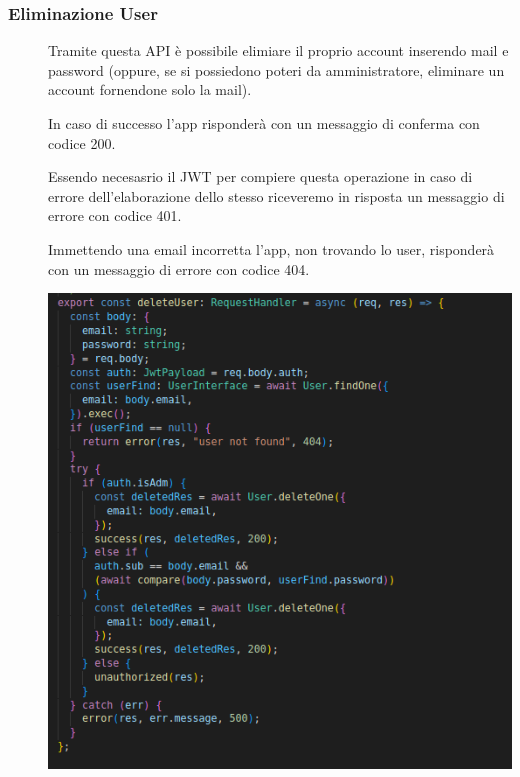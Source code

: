 \documentclass{article}
\begin{document}
\subsubsection{Eliminazione User}
\begin{description}
    \item[] Tramite questa API è possibile elimiare il proprio account inserendo mail e password (oppure, se si possiedono poteri da amministratore, eliminare un account fornendone solo la mail).
    \item[] In caso di successo l'app risponderà con un messaggio di conferma con codice 200.
    \item[] Essendo necesasrio il JWT per compiere questa operazione in caso di errore dell'elaborazione dello stesso riceveremo in risposta un messaggio di errore con codice 401.
    \item[] Immettendo una email incorretta l'app, non trovando lo user, risponderà con un messaggio di errore con codice 404.
    \item[] \begin{center}
            \includegraphics[scale=0.5]{deleteUser.png}
        \end{center}
\end{description}
\end{document}
